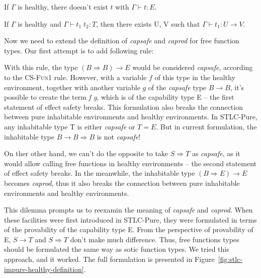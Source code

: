 \begin{definition}
  If $\Gamma$ is healthy, there doesn't exist $t$ with
  $\Gamma \vdash t : E$.
\end{definition}

\begin{definition}
  If $\Gamma$ is healthy and $\Gamma \vdash t_1 \; t_2 : T$, then
  there exists U, V such that $\Gamma \vdash t_1 : U \to V$.
\end{definition}

Now we need to extend the definition of \emph{capsafe} and
\emph{caprod} for free function types. Our first attempt is to add
following rule:


With this rule, the type $(B \Rightarrow B) \to E$ would be considered
\emph{capsafe}, according to the \textsc{CS-Fun1} rule. However, with
a variable $f$ of this type in the healthy environment, together with
another variable $g$ of the \emph{capsafe} type $B \to B$, it's
possible to create the term \emph{f g}, which is of the capability
type E -- the first statement of effect safety breaks. This
formulation also breaks the connection between pure inhabitable
environments and healthy environments. In STLC-Pure, any inhabitable
type T is either \emph{capsafe} or $T = E$. But in current
formulation, the inhabitable type $B \to B \Rightarrow B$ is not
\emph{capsafe}!

On ther other hand, we can't do the opposite to take $S \Rightarrow T$
as \emph{capsafe}, as it would allow calling free functions in healthy
environments -- the second statement of effect safety breaks. In the
meanwhile, the inhabitable type $(B \Rightarrow E) \to E$ becomes
\emph{caprod}, thus it also breaks the connection between pure
inhabitable environments and healthy environments.

This dilemma prompts us to reexamin the meaning of \emph{capsafe} and
\emph{caprod}. When these facilities were first introduced in
STLC-Pure, they were formulated in terms of the provability of the
capability type E. From the perspective of provability of E, $S \to T$
and $S \Rightarrow T$ don't make much difference. Thus, free functions
types should be formulated the same way as sotic function types. We
tried this approach, and it worked. The full formulation is presented
in Figure~\ref{fig:stlc-impure-healthy-definition}.

